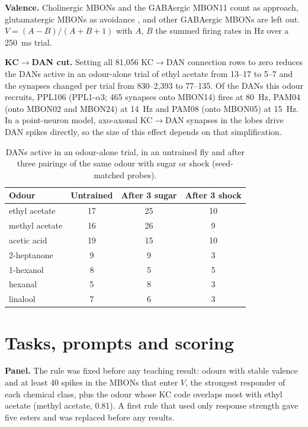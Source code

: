 \textbf{Valence.} Cholinergic MBONs and the GABAergic MBON11 count as approach, glutamatergic MBONs as avoidance \citep{aso2014}, and other GABAergic MBONs are left out. $V=(A-B)/(A+B+1)$ with $A$, $B$ the summed firing rates in Hz over a 250~ms trial.

\textbf{KC$\rightarrow$DAN cut.} Setting all 81{,}056 KC$\rightarrow$DAN connection rows to zero reduces the DANs active in an odour-alone trial of ethyl acetate from 13--17 to 5--7 and the synapses changed per trial from 830--2{,}393 to 77--135. Of the DANs this odour recruits, PPL106 (PPL1-$\alpha$3; 465 synapses onto MBON14) fires at 80~Hz, PAM04 (onto MBON02 and MBON24) at 14~Hz and PAM08 (onto MBON05) at 15~Hz. In a point-neuron model, axo-axonal KC$\rightarrow$DAN synapses in the lobes drive DAN spikes directly, so the size of this effect depends on that simplification.

\begin{table}[h]
\centering
\caption{DANs active in an odour-alone trial, in an untrained fly and after three pairings of the same odour with sugar or shock (seed-matched probes).}
\label{tab:dan}
\small
\begin{tabular}{lccc}
\toprule
Odour & Untrained & After 3 sugar & After 3 shock \\
\midrule
ethyl acetate & 17 & 25 & 10 \\
methyl acetate & 16 & 26 & 9 \\
acetic acid & 19 & 15 & 10 \\
2-heptanone & 9 & 9 & 3 \\
1-hexanol & 8 & 5 & 5 \\
hexanal & 5 & 8 & 3 \\
linalool & 7 & 6 & 3 \\
\bottomrule
\end{tabular}
\end{table}

\section{Tasks, prompts and scoring}\label{app:tasks}
\textbf{Panel.} The rule was fixed before any teaching result: odours with stable valence and at least 40 spikes in the MBONs that enter $V$, the strongest responder of each chemical class, plus the odour whose KC code overlaps most with ethyl acetate (methyl acetate, 0.81). A first rule that used only response strength gave five esters and was replaced before any results.

